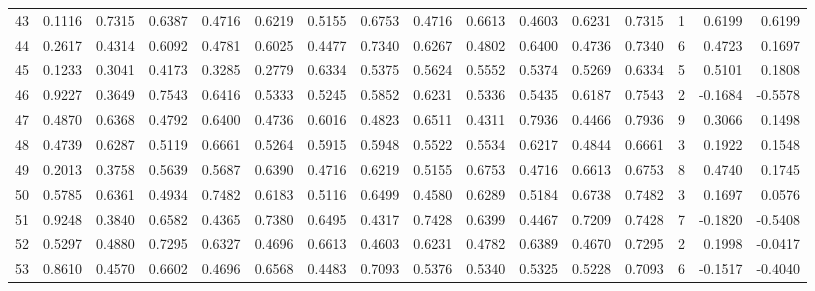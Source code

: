 \begin{tabular}{lrrrrrrrrrrrrrrr}
43  &      0.1116 &  0.7315 &  0.6387 &  0.4716 &  0.6219 &  0.5155 &  0.6753 &  0.4716 &  0.6613 &  0.4603 &   0.6231 &     0.7315 &      1 &                    0.6199 &                     0.6199 \\
44  &      0.2617 &  0.4314 &  0.6092 &  0.4781 &  0.6025 &  0.4477 &  0.7340 &  0.6267 &  0.4802 &  0.6400 &   0.4736 &     0.7340 &      6 &                    0.4723 &                     0.1697 \\
45  &      0.1233 &  0.3041 &  0.4173 &  0.3285 &  0.2779 &  0.6334 &  0.5375 &  0.5624 &  0.5552 &  0.5374 &   0.5269 &     0.6334 &      5 &                    0.5101 &                     0.1808 \\
46  &      0.9227 &  0.3649 &  0.7543 &  0.6416 &  0.5333 &  0.5245 &  0.5852 &  0.6231 &  0.5336 &  0.5435 &   0.6187 &     0.7543 &      2 &                   -0.1684 &                    -0.5578 \\
47  &      0.4870 &  0.6368 &  0.4792 &  0.6400 &  0.4736 &  0.6016 &  0.4823 &  0.6511 &  0.4311 &  0.7936 &   0.4466 &     0.7936 &      9 &                    0.3066 &                     0.1498 \\
48  &      0.4739 &  0.6287 &  0.5119 &  0.6661 &  0.5264 &  0.5915 &  0.5948 &  0.5522 &  0.5534 &  0.6217 &   0.4844 &     0.6661 &      3 &                    0.1922 &                     0.1548 \\
49  &      0.2013 &  0.3758 &  0.5639 &  0.5687 &  0.6390 &  0.4716 &  0.6219 &  0.5155 &  0.6753 &  0.4716 &   0.6613 &     0.6753 &      8 &                    0.4740 &                     0.1745 \\
50  &      0.5785 &  0.6361 &  0.4934 &  0.7482 &  0.6183 &  0.5116 &  0.6499 &  0.4580 &  0.6289 &  0.5184 &   0.6738 &     0.7482 &      3 &                    0.1697 &                     0.0576 \\
51  &      0.9248 &  0.3840 &  0.6582 &  0.4365 &  0.7380 &  0.6495 &  0.4317 &  0.7428 &  0.6399 &  0.4467 &   0.7209 &     0.7428 &      7 &                   -0.1820 &                    -0.5408 \\
52  &      0.5297 &  0.4880 &  0.7295 &  0.6327 &  0.4696 &  0.6613 &  0.4603 &  0.6231 &  0.4782 &  0.6389 &   0.4670 &     0.7295 &      2 &                    0.1998 &                    -0.0417 \\
53  &      0.8610 &  0.4570 &  0.6602 &  0.4696 &  0.6568 &  0.4483 &  0.7093 &  0.5376 &  0.5340 &  0.5325 &   0.5228 &     0.7093 &      6 &                   -0.1517 &                    -0.4040 \\

\end{tabular}
